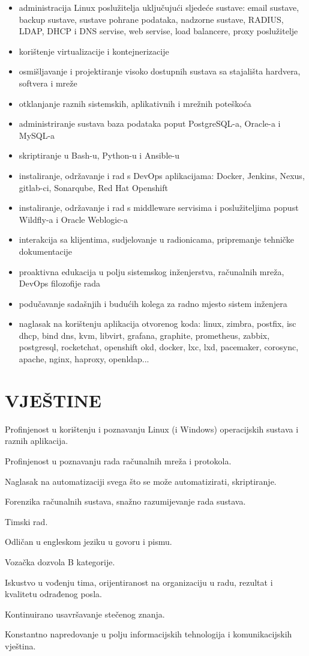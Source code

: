 \documentclass{cv}
\begin{document}
\begin{itemize}
    \setlength\itemsep{0.1cm}
    \item administracija Linux poslužitelja uključujući sljedeće sustave: email sustave, backup sustave, sustave pohrane podataka, nadzorne sustave, RADIUS, LDAP, DHCP i DNS servise, web servise, load balancere, proxy poslužitelje
    \item korištenje virtualizacije i kontejnerizacije
    \item osmišljavanje i projektiranje visoko dostupnih sustava sa stajališta hardvera, softvera i mreže
    \item otklanjanje raznih sistemskih, aplikativnih i mrežnih poteškoća
    \item administriranje sustava baza podataka poput PostgreSQL-a, Oracle-a i MySQL-a
    \item skriptiranje u Bash-u, Python-u i Ansible-u 
    \item instaliranje, održavanje i rad s DevOps aplikacijama: Docker, Jenkins, Nexus, gitlab-ci, Sonarqube, Red Hat Openshift
    \item instaliranje, održavanje i rad s middleware servisima i poslužiteljima popust Wildfly-a i Oracle Weblogic-a
    \item interakcija sa klijentima, sudjelovanje u radionicama, pripremanje tehničke dokumentacije
    \item proaktivna edukacija u polju sistemskog inženjerstva, računalnih mreža, DevOps filozofije rada
    \item podučavanje sadašnjih i budućih kolega za radno mjesto sistem inženjera
    \item naglasak na korištenju aplikacija otvorenog koda: linux, zimbra, postfix, isc dhcp, bind dns, kvm, libvirt, grafana, graphite, prometheus, zabbix, postgresql, rocketchat, openshift okd, docker, lxc, lxd, pacemaker, corosync, apache, nginx, haproxy, openldap...
\end{itemize}
\section{VJEŠTINE}
Profinjenost u korištenju i poznavanju Linux (i Windows) operacijskih sustava i raznih aplikacija.

Profinjenost u poznavanju rada računalnih mreža i protokola.

Naglasak na automatizaciji svega što se može automatizirati, skriptiranje.

Forenzika računalnih sustava, snažno razumijevanje rada sustava.

Timski rad.

Odličan u engleskom jeziku u govoru i pismu.

Vozačka dozvola B kategorije.

Iskustvo u vođenju tima, orijentiranost na organizaciju u radu, rezultat i kvalitetu odrađenog posla.

Kontinuirano usavršavanje stečenog znanja.

Konstantno napredovanje u polju informacijskih tehnologija i komunikacijskih vještina.
\end{document}

